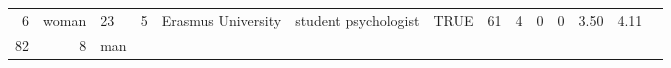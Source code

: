 \documentclass[]{svmono}
\theoremstyle{definition}
\theoremstyle{definition}
\theoremstyle{definition}
\theoremstyle{remark}
\begin{document}
\begin{longtable}[]{@{}rrlrrlllrrrrrr@{}}
\begin{minipage}[t]{0.03\columnwidth}
6\strut
\end{minipage} & \begin{minipage}[t]{0.03\columnwidth}\raggedright\strut
woman\strut
\end{minipage} & \begin{minipage}[t]{0.02\columnwidth}\raggedleft\strut
23\strut
\end{minipage} & \begin{minipage}[t]{0.03\columnwidth}\raggedleft\strut
5\strut
\end{minipage} & \begin{minipage}[t]{0.09\columnwidth}\raggedright\strut
Erasmus University\strut
\end{minipage} & \begin{minipage}[t]{0.14\columnwidth}\raggedright\strut
student psychologist\strut
\end{minipage} & \begin{minipage}[t]{0.04\columnwidth}\raggedright\strut
TRUE\strut
\end{minipage} & \begin{minipage}[t]{0.02\columnwidth}\raggedleft\strut
61\strut
\end{minipage} & \begin{minipage}[t]{0.03\columnwidth}\raggedleft\strut
4\strut
\end{minipage} & \begin{minipage}[t]{0.05\columnwidth}\raggedleft\strut
0\strut
\end{minipage} & \begin{minipage}[t]{0.06\columnwidth}\raggedleft\strut
0\strut
\end{minipage} & \begin{minipage}[t]{0.04\columnwidth}\raggedleft\strut
3.50\strut
\end{minipage} & \begin{minipage}[t]{0.03\columnwidth}\raggedleft\strut
4.11\strut
\end{minipage}\tabularnewline
\begin{minipage}[t]{0.02\columnwidth}\raggedleft\strut
82\strut
\end{minipage} & \begin{minipage}[t]{0.03\columnwidth}\raggedleft\strut
8\strut
\end{minipage} & \begin{minipage}[t]{0.03\columnwidth}\raggedright\strut
man\strut
\end{minipage} & \begin{minipage}[t]{0.02\columnwidth}\raggedleft\strut

\end{minipage}
\end{longtable}
\end{document}
